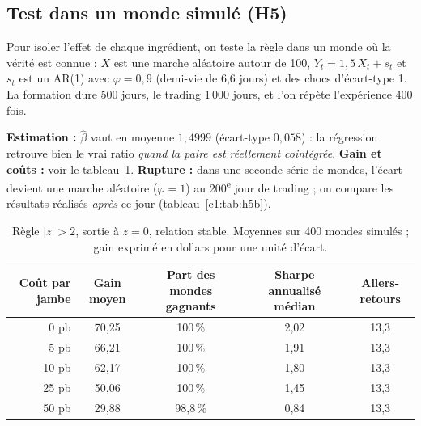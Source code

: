 \subsection{Test dans un monde simulé (H5)}

Pour isoler l'effet de chaque ingrédient, on teste la règle dans un monde où la vérité est connue : $X$ est une marche aléatoire autour de 100, $Y_t = 1{,}5\,X_t + s_t$ et $s_t$ est un AR(1) avec $\varphi = 0{,}9$ (demi-vie de 6,6 jours) et des chocs d'écart-type 1. La formation dure 500 jours, le trading 1\,000 jours, et l'on répète l'expérience 400 fois.

\begin{codebox}
\textbf{Estimation :} $\hat\beta$ vaut en moyenne $1{,}4999$ (écart-type $0{,}058$) : la régression retrouve bien le vrai ratio \emph{quand la paire est réellement cointégrée}. \textbf{Gain et coûts :} voir le tableau~\ref{c1:tab:h5}. \textbf{Rupture :} dans une seconde série de mondes, l'écart devient une marche aléatoire ($\varphi = 1$) au 200\textsuperscript{e} jour de trading ; on compare les résultats réalisés \emph{après} ce jour (tableau~\ref{c1:tab:h5b}).
\end{codebox}

\begin{table}[h]
\centering\small
\caption{Règle $|z|>2$, sortie à $z = 0$, relation stable. Moyennes sur 400 mondes simulés ; gain exprimé en dollars pour une unité d'écart.}
\label{c1:tab:h5}
\begin{tabular}{rcccc}
\toprule
Coût par jambe & Gain moyen & Part des mondes gagnants & Sharpe annualisé médian & Allers-retours \\
\midrule
0 pb & 70,25 & 100\,\% & 2,02 & 13,3 \\
5 pb & 66,21 & 100\,\% & 1,91 & 13,3 \\
10 pb & 62,17 & 100\,\% & 1,80 & 13,3 \\
25 pb & 50,06 & 100\,\% & 1,45 & 13,3 \\
50 pb & 29,88 & 98,8\,\% & 0,84 & 13,3 \\
\bottomrule
\end{tabular}
\end{table}

